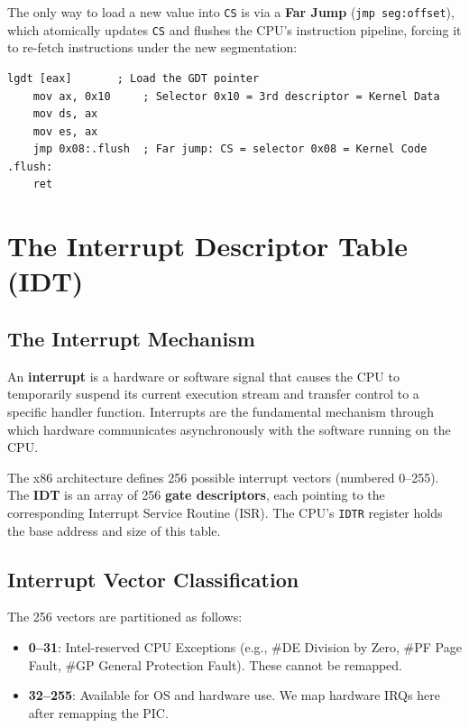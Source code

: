 \documentclass[12pt,a4paper]{report}
\begin{document}
The only way to load a new value into \texttt{CS} is via a \textbf{Far Jump}
(\texttt{jmp seg:offset}), which atomically updates \texttt{CS} and flushes the CPU's
instruction pipeline, forcing it to re-fetch instructions under the new segmentation:

\begin{lstlisting}[language={[x86masm]Assembler}, title=boot/gdt\_flush.asm]
    lgdt [eax]       ; Load the GDT pointer
    mov ax, 0x10     ; Selector 0x10 = 3rd descriptor = Kernel Data
    mov ds, ax
    mov es, ax
    jmp 0x08:.flush  ; Far jump: CS = selector 0x08 = Kernel Code
.flush:
    ret
\end{lstlisting}

\section{The Interrupt Descriptor Table (IDT)}

\subsection{The Interrupt Mechanism}

An \textbf{interrupt} is a hardware or software signal that causes the CPU to
temporarily suspend its current execution stream and transfer control to a specific
handler function. Interrupts are the fundamental mechanism through which hardware
communicates asynchronously with the software running on the CPU.

The x86 architecture defines 256 possible interrupt vectors (numbered 0--255). The
\textbf{IDT} is an array of 256 \textbf{gate descriptors}, each pointing to the
corresponding Interrupt Service Routine (ISR). The CPU's \texttt{IDTR} register
holds the base address and size of this table.

\subsection{Interrupt Vector Classification}

The 256 vectors are partitioned as follows:
\begin{itemize}
    \item \textbf{0--31}: Intel-reserved CPU Exceptions (e.g., \#DE Division by Zero,
    \#PF Page Fault, \#GP General Protection Fault). These cannot be remapped.
    \item \textbf{32--255}: Available for OS and hardware use. We map hardware IRQs
    here after remapping the PIC.
\end{itemize}
\end{document}
